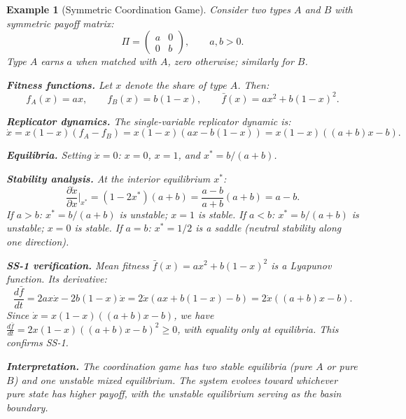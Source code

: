 \documentclass[12pt]{article}
\newtheorem{example}[theorem]{Example}
\begin{document}
\begin{example}[Symmetric Coordination Game]
\label{ex:coordination}
Consider two types $A$ and $B$ with symmetric payoff matrix:
\[
\Pi = \begin{pmatrix} a & 0 \\ 0 & b \end{pmatrix}, \qquad a, b > 0.
\]
Type $A$ earns $a$ when matched with $A$, zero otherwise; similarly for $B$.

\textbf{Fitness functions.} Let $x$ denote the share of type $A$. Then:
\[
f_A(x) = ax, \qquad f_B(x) = b(1-x), \qquad \bar{f}(x) = ax^2 + b(1-x)^2.
\]

\textbf{Replicator dynamics.} The single-variable replicator dynamic is:
\[
\dot{x} = x(1-x)(f_A - f_B) = x(1-x)(ax - b(1-x)) = x(1-x)((a+b)x - b).
\]

\textbf{Equilibria.} Setting $\dot{x} = 0$: $x = 0$, $x = 1$, and $x^* = b/(a+b)$.

\textbf{Stability analysis.} At the interior equilibrium $x^*$:
\[
\frac{\partial \dot{x}}{\partial x}\bigg|_{x^*} = (1 - 2x^*)(a+b) = \frac{a-b}{a+b}(a+b) = a - b.
\]
If $a > b$: $x^* = b/(a+b)$ is unstable; $x = 1$ is stable.
If $a < b$: $x^* = b/(a+b)$ is unstable; $x = 0$ is stable.
If $a = b$: $x^* = 1/2$ is a saddle (neutral stability along one direction).

\textbf{SS-1 verification.} Mean fitness $\bar{f}(x) = ax^2 + b(1-x)^2$ is a Lyapunov function. Its derivative:
\[
\frac{d\bar{f}}{dt} = 2ax \dot{x} - 2b(1-x)\dot{x} = 2\dot{x}(ax + b(1-x) - b) = 2\dot{x}((a+b)x - b).
\]
Since $\dot{x} = x(1-x)((a+b)x - b)$, we have $\frac{d\bar{f}}{dt} = 2x(1-x)((a+b)x - b)^2 \geq 0$, with equality only at equilibria. This confirms SS-1.

\textbf{Interpretation.} The coordination game has two stable equilibria (pure $A$ or pure $B$) and one unstable mixed equilibrium. The system evolves toward whichever pure state has higher payoff, with the unstable equilibrium serving as the basin boundary.
\end{example}
\end{document}
